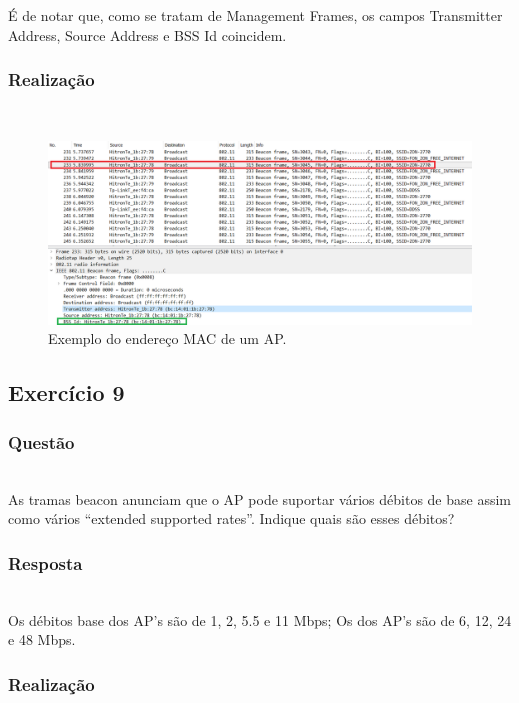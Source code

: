 \documentclass{llncs}
\begin{document}
É de notar que, como se tratam de Management Frames, os campos Transmitter Address, Source Address e BSS Id coincidem.

\subsubsection{Realização}\rule[-10pt]{0pt}{10pt}\\

\begin{figure}
  \begin{center}
  \includegraphics[scale=0.35]{imagens/beacon_MAC.png} 
  \end{center}
  \caption{Exemplo do endereço MAC de um AP.}
  \label{fig:beacon_mac}
\end{figure}


\clearpage
\subsection{Exercício 9}
\subsubsection{Questão}\rule[-10pt]{0pt}{10pt}\\

As tramas beacon anunciam que o AP pode suportar vários débitos de base assim como vários “extended supported rates”. Indique quais são esses débitos?

\subsubsection{Resposta}\rule[-10pt]{0pt}{10pt}\\

Os débitos base dos AP's são de 1, 2, 5.5 e 11 Mbps; Os  dos AP's são de 6, 12, 24 e 48 Mbps.

\subsubsection{Realização}\rule[-10pt]{0pt}{10pt}\\
\end{document}
